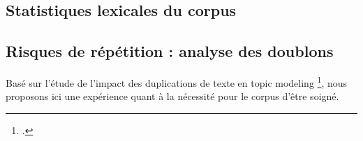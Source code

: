 \subsection{Statistiques lexicales du corpus}
\label{subsec:corpus_lexical_stats}

\subsection{Risques de répétition : analyse des doublons}
\label{subsec:corpus_repetition}

Basé sur l'étude de l'impact des duplications de texte en topic modeling \footcite{schofield2017quantifying}, nous proposons ici une expérience
quant à la nécessité pour le corpus d'être soigné.